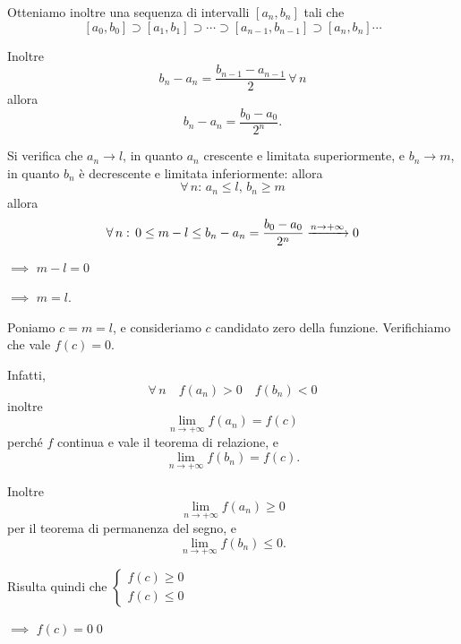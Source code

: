 {\begin{itemize}
        Otteniamo inoltre una sequenza di intervalli $ [a_{n}, b_{n}]  $ tali che \[
            [a_0, b_0]\supset [a_1, b_1] \supset \cdots \supset [a_{n-1}, b_{n-1}  ]\supset [a_{n}, b_{n}  ]\cdots
        \]

        Inoltre \[
            b_{n}-a_{n}=\frac{b_{n-1}-a_{n-1}}{2}\, \forall\,n
        \] allora \[
            b_{n}-a_{n}= \frac{b_0-a_0}{2^{n}}.
        \]

        Si verifica che $ a_{n} \longrightarrow l $, in quanto $ a_{n} $ crescente e limitata superiormente, e $ b_{n} \longrightarrow m $, in quanto $ b_{n} $ è decrescente e limitata inferiormente: allora \[
            \forall\,n:\, a_{n}\le l,\,b_{n}\ge m  
        \] allora \[
            \forall\, n:\, 0\le m-l\le b_{n}-a_{n}=\frac{b_0-a_0}{2^{n}} \xrightarrow{n\to +\infty} 0 \displaystyle  
        \] 
        
        $\implies$ $ m-l=0 $ 
        
        $\implies$ $ m=l $.

        Poniamo $ c=m=l $, e consideriamo $ c $ candidato zero della funzione. Verifichiamo che vale $ f(c)=0 $.

        Infatti,\[
            \forall\,n\quad f(a_{n}) >0\quad f(b_{n} )<0
        \]
        inoltre \[
            \lim_{n\to +\infty} f(a_{n} ) = f(c)
        \]
        perché $ f $ continua e vale il teorema di relazione, e \[
            \lim_{n\to +\infty} f(b_{n} ) = f(c).
        \]
        
        Inoltre \[
            \lim_{n\to +\infty} f(a_{n} ) \ge 0
        \]
        per il teorema di permanenza del segno, e 
        \[
            \lim_{n\to +\infty} f(b_{n} ) \le 0.
        \]

        Risulta quindi che $ \begin{cases}
            f(c)\ge 0 \\
            f(c)\le 0
        \end{cases} $ 
        
        $\implies$ $ f(c)=0 $\qed
    \end{itemize}
}



